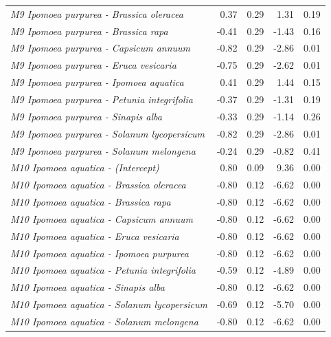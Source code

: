 \documentclass[
  12pt,
]{article}
\begin{document}
\begin{longtable}[t]{>{\em}lrrrr}
\addlinespace
M9 Ipomoea purpurea - Brassica oleracea & 0.37 & 0.29 & 1.31 & 0.19\\
\addlinespace
\rowcolor{gray!6}  M9 Ipomoea purpurea - Brassica rapa & -0.41 & 0.29 & -1.43 & 0.16\\
\addlinespace
M9 Ipomoea purpurea - Capsicum annuum & -0.82 & 0.29 & -2.86 & 0.01\\
\addlinespace
\rowcolor{gray!6}  M9 Ipomoea purpurea - Eruca vesicaria & -0.75 & 0.29 & -2.62 & 0.01\\
\addlinespace
M9 Ipomoea purpurea - Ipomoea aquatica & 0.41 & 0.29 & 1.44 & 0.15\\
\addlinespace
\rowcolor{gray!6}  M9 Ipomoea purpurea - Petunia integrifolia & -0.37 & 0.29 & -1.31 & 0.19\\
\addlinespace
M9 Ipomoea purpurea - Sinapis alba & -0.33 & 0.29 & -1.14 & 0.26\\
\addlinespace
\rowcolor{gray!6}  M9 Ipomoea purpurea - Solanum lycopersicum & -0.82 & 0.29 & -2.86 & 0.01\\
\addlinespace
M9 Ipomoea purpurea - Solanum melongena & -0.24 & 0.29 & -0.82 & 0.41\\
\addlinespace
\rowcolor{gray!6}  M10 Ipomoea aquatica - (Intercept) & 0.80 & 0.09 & 9.36 & 0.00\\
\addlinespace
M10 Ipomoea aquatica - Brassica oleracea & -0.80 & 0.12 & -6.62 & 0.00\\
\addlinespace
\rowcolor{gray!6}  M10 Ipomoea aquatica - Brassica rapa & -0.80 & 0.12 & -6.62 & 0.00\\
\addlinespace
M10 Ipomoea aquatica - Capsicum annuum & -0.80 & 0.12 & -6.62 & 0.00\\
\addlinespace
\rowcolor{gray!6}  M10 Ipomoea aquatica - Eruca vesicaria & -0.80 & 0.12 & -6.62 & 0.00\\
\addlinespace
M10 Ipomoea aquatica - Ipomoea purpurea & -0.80 & 0.12 & -6.62 & 0.00\\
\addlinespace
\rowcolor{gray!6}  M10 Ipomoea aquatica - Petunia integrifolia & -0.59 & 0.12 & -4.89 & 0.00\\
\addlinespace
M10 Ipomoea aquatica - Sinapis alba & -0.80 & 0.12 & -6.62 & 0.00\\
\addlinespace
\rowcolor{gray!6}  M10 Ipomoea aquatica - Solanum lycopersicum & -0.69 & 0.12 & -5.70 & 0.00\\
\addlinespace
M10 Ipomoea aquatica - Solanum melongena & -0.80 & 0.12 & -6.62 & 0.00\\
\bottomrule
\end{longtable}
\endgroup{}
\end{document}

